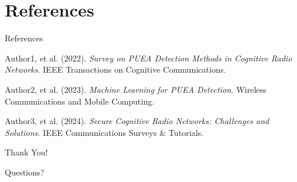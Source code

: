 \documentclass{beamer}
\begin{document}
\section{References}
\begin{frame}[allowframebreaks]{References}
    \begin{thebibliography}{9}
        Author1, et al. (2022).
        \textit{Survey on PUEA Detection Methods in Cognitive Radio Networks}.
        IEEE Transactions on Cognitive Communications.
        
        Author2, et al. (2023).
        \textit{Machine Learning for PUEA Detection}.
        Wireless Communications and Mobile Computing.
        
        Author3, et al. (2024).
        \textit{Secure Cognitive Radio Networks: Challenges and Solutions}.
        IEEE Communications Surveys \& Tutorials.
    \end{thebibliography}
\end{frame}

\begin{frame}
    \centering
    \huge{Thank You!}
    \vspace{1cm}
    
    \Large{Questions?}
\end{frame}
\end{document}
